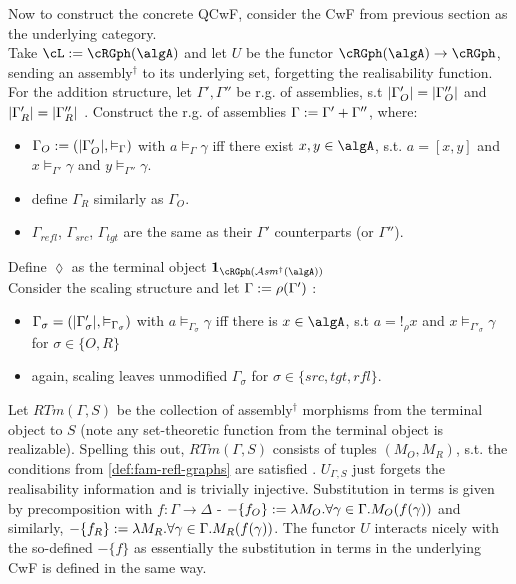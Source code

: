 \documentclass[12pt,a4paper]{article}
\def\cAsm{\mathcal{A}\mathit{sm}^\dagger}
\def\src{_{src}}\alwaysmath{src}
\def\rfl{_{refl}}\alwaysmath{rfl}
\def\tgt{_{tgt}}\alwaysmath{tgt}
\renewcommand{\O}{_{O}}
\newcommand{\R}{\ensuremath{_{R}}}
\begin{document}
Now to construct the concrete QCwF, consider the CwF from previous section as the underlying category.\\
Take $\cL := \cRGph(\algA)$  and let $U$ be the functor $\cRGph(\algA) \to \cRGph$, sending an assembly$^\dagger$ to its underlying set, forgetting the realisability function.\\
For the addition structure, let $\Gamma', \Gamma''$ be r.g. of assemblies, s.t  $\carr{\Gamma'\O}=\carr{\Gamma''\O}$ and $\carr{\Gamma'\R}=\carr{\Gamma''\R}$ \FNF{no \carr{\cdot} for $\R$ part}. Construct the r.g. of assemblies $\Gamma := \Gamma' + \Gamma''$, where:
\begin{itemize}[noitemsep]
    \item $\Gamma\O \define (\carr{\Gamma'\O}, \vDash_\Gamma)$ with $ a \vDash_\Gamma \gamma$ iff there exist $x,y \in \algA$, s.t. $a = [x,y]$ and $x \vDash_{\Gamma'} \gamma$ and $ y \vDash_{\Gamma''} \gamma$.

    \item define $\Gamma\R$ similarly as $\Gamma\O$. \FNF{this is just $\Gamma\R = \Gamma'\R (= \Gamma''\R)$}

    \item $\Gamma\rfl$, $\Gamma\src$, $\Gamma\tgt$ are the same as their $\Gamma'$ counterparts (or $\Gamma''$).\\
\end{itemize}
Define $\lozenge$ as the terminal object $\mathbf{1}_{\cRGph(\cAsm(\algA))}$\\
Consider the scaling structure and let $\Gamma := \rho(\Gamma')$ :
  \begin{itemize}
    \item $\Gamma_\sigma = (|\Gamma'_\sigma|, \vDash_{\Gamma_\sigma})$ with $a \vDash_{\Gamma_\sigma} \gamma$ iff there is $x \in \algA$, s.t $a = !_\rho x$ and $x \vDash_{\Gamma'_\sigma} \gamma$ for $\sigma \in \{O, R\}$
    
    \item again, scaling leaves unmodified $\Gamma_\sigma$ for $\sigma\in\{src,tgt,rfl\}$.
\end{itemize}
Let $RTm(\Gamma, S)$ be the collection of assembly$^\dagger$ morphisms from the terminal object to $S$ (note any set-theoretic function from the terminal object is realizable). Spelling this out, $RTm(\Gamma, S)$ consists of tuples $(M\O, M\R)$, s.t. the conditions from \cref{def:fam-refl-graphs} are satisfied . $U_{\Gamma,S}$ just forgets the realisability information and is trivially injective. Substitution in terms is given by precomposition with $f : \Gamma \to \Delta$ - $-\{f\O\} \define \lambda M\O. \forall \gamma \in \Gamma . M\O(f(\gamma))$ and similarly, $-\{f\R\} \define \lambda M\R . \forall \gamma \in \Gamma . M\R(f(\gamma))$. The functor $U$ interacts nicely with the so-defined $-\{f\}$ as essentially the substitution in terms in the underlying CwF is defined in the same way.\\
\end{document}
